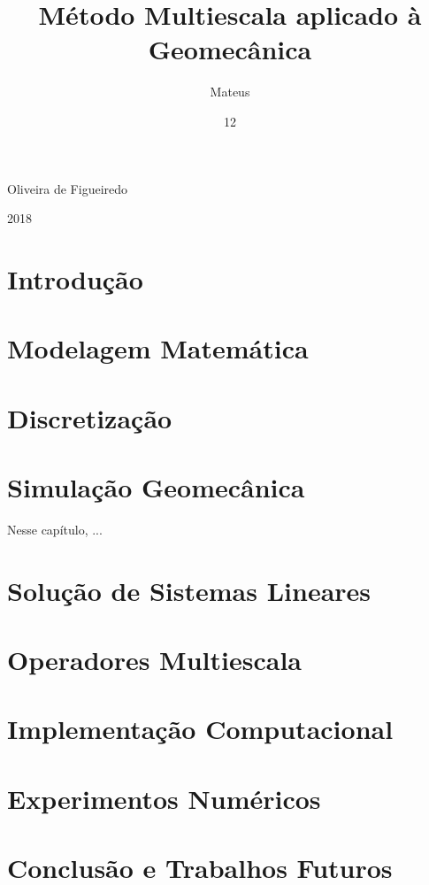 \documentclass[dsc,pdftex]{coppe}
\begin{document}
  \title{Método Multiescala aplicado à Geomecânica}
  \author{Mateus}{Oliveira de Figueiredo}
  \date{12}{2018}
  \maketitle

  \frontmatter
  \tableofcontents
  \listoffigures
  \listoftables
  \printlosymbols
  \printloabbreviations

  \mainmatter

  \chapter{Introdução}

  \chapter{Modelagem Matemática} \label{ch:modelagem}
  

  \chapter{Discretização} \label{ch:discretizacao}

  \chapter{Simulação Geomecânica}

  Nesse capítulo, ...

  \chapter{Solução de Sistemas Lineares}
  

  \chapter{Operadores Multiescala}\label{ch:multiescala}
  

  \chapter{Implementação Computacional}\label{ch:implementacao}

  \chapter{Experimentos Numéricos}
  

  \chapter{Conclusão e Trabalhos Futuros}

  \backmatter
  \nocite{*}
  
  
  \appendix
  
\end{document}
